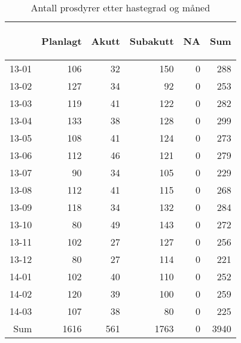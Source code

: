 \documentclass[presentation,xcolor=pdftex,dvipsnames,table]{beamer}
\begin{document}
\begin{frame}
\begin{tiny}
\begin{table}[ht]
\centering
\begin{tabular}{rrrrrr}
  \toprule
 & \begin{sideways} Planlagt \end{sideways} & \begin{sideways} Akutt \end{sideways} & \begin{sideways} Subakutt \end{sideways} & \begin{sideways} NA \end{sideways} & \begin{sideways} Sum \end{sideways} \\ 
  \midrule
13-01 & 106 & 32 & 150 & 0 & 288 \\ 
  13-02 & 127 & 34 & 92 & 0 & 253 \\ 
  13-03 & 119 & 41 & 122 & 0 & 282 \\ 
  13-04 & 133 & 38 & 128 & 0 & 299 \\ 
  13-05 & 108 & 41 & 124 & 0 & 273 \\ 
  13-06 & 112 & 46 & 121 & 0 & 279 \\ 
  13-07 & 90 & 34 & 105 & 0 & 229 \\ 
  13-08 & 112 & 41 & 115 & 0 & 268 \\ 
  13-09 & 118 & 34 & 132 & 0 & 284 \\ 
  13-10 & 80 & 49 & 143 & 0 & 272 \\ 
  13-11 & 102 & 27 & 127 & 0 & 256 \\ 
  13-12 & 80 & 27 & 114 & 0 & 221 \\ 
  14-01 & 102 & 40 & 110 & 0 & 252 \\ 
  14-02 & 120 & 39 & 100 & 0 & 259 \\ 
  14-03 & 107 & 38 & 80 & 0 & 225 \\ 
  Sum & 1616 & 561 & 1763 & 0 & 3940 \\ 
   \bottomrule
\end{tabular}
\caption{Antall prosdyrer etter hastegrad og måned} 
\end{table}\end{tiny}
\end{frame}


\end{document}
